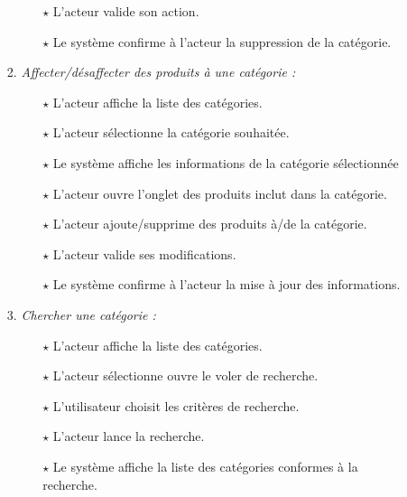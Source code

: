 \begin{itemize}
\begin{itemize}
\begin{enumerate}
\begin{itemize}
                       \item[$\star$] L’acteur valide son action.
                       \item[$\star$] Le système confirme à l’acteur la suppression de la catégorie.
                    \end{itemize}
                \item \textit{Affecter/désaffecter des produits à une catégorie :}
                    \begin{itemize}
                        \item[$\star$] L’acteur affiche la liste des catégories. 
                       \item[$\star$] L’acteur sélectionne la catégorie souhaitée. 
                       \item[$\star$] Le système affiche les informations de la catégorie sélectionnée
                       \item[$\star$] L’acteur ouvre l'onglet des produits inclut dans la catégorie. 
                       \item[$\star$] L’acteur ajoute/supprime des produits à/de la catégorie.
                       \item[$\star$] L’acteur valide ses modifications.
                       \item[$\star$] Le système confirme à l’acteur la mise à jour des informations.
                    \end{itemize}
                \item \textit{Chercher une catégorie :}
                    \begin{itemize}
                       \item[$\star$] L’acteur affiche la liste des catégories. 
                       \item[$\star$] L’acteur sélectionne ouvre le voler de recherche. 
                       \item[$\star$] L'utilisateur choisit les critères de recherche. 
                       \item[$\star$] L’acteur lance la recherche.
                       \item[$\star$] Le système affiche la liste des catégories conformes à la recherche.
                    \end{itemize}
         \end{enumerate}
    \end{itemize}
    \bigskip

    


    \end{itemize}
        \bigskip

